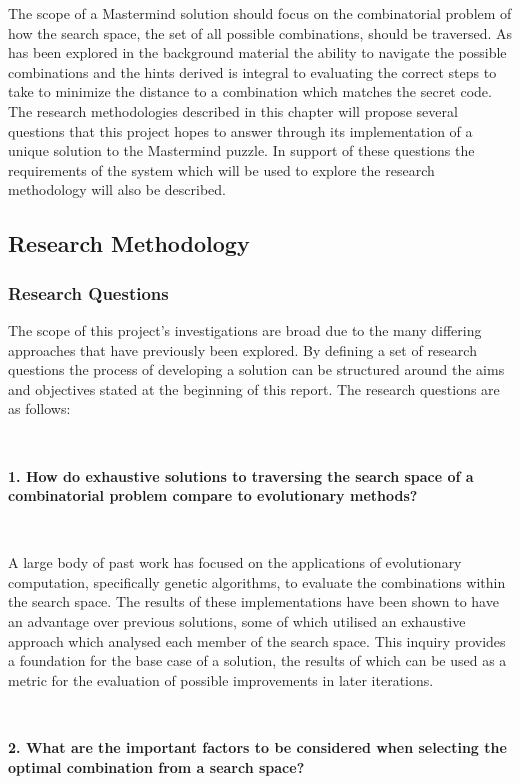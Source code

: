 \documentclass[12pt]{article}  %
\theoremstyle{definition}
\theoremstyle{remark}
\begin{document}
The scope of a Mastermind solution should focus on the combinatorial problem of how the search space, the set of all possible combinations, should be traversed. As has been explored in the background material the ability to navigate the possible combinations and the hints derived is integral to evaluating the correct steps to take to minimize the distance to a combination which matches the secret code. The research methodologies described in this chapter will propose several questions that this project hopes to answer through its implementation of a unique solution to the Mastermind puzzle. In support of these questions the requirements of the system which will be used to explore the research methodology will also be described.

\subsection {Research Methodology}

\subsubsection {Research Questions}

The scope of this project's investigations are broad due to the many differing approaches that have previously been explored. By defining a set of research questions the process of developing a solution can be structured around the aims and objectives stated at the beginning of this report. The research questions are as follows:

\

\textbf{1. How do exhaustive solutions to traversing the search space of a combinatorial problem compare to evolutionary methods?}

\

A large body of past work has focused on the applications of evolutionary computation, specifically genetic algorithms, to evaluate the combinations within the search space. The results of these implementations have been shown to have an advantage over previous solutions, some of which utilised an exhaustive approach which analysed each member of the search space. This inquiry provides a foundation for the base case of a solution, the results of which can be used as a metric for the evaluation of possible improvements in later iterations.

\

\textbf{2. What are the important factors to be considered when selecting the optimal combination from a search space?}
\end{document}
